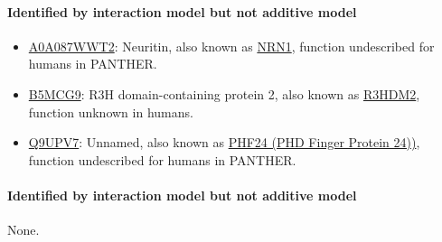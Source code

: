 \paragraph{Identified by interaction model but not additive model}

{
\small

\begin{itemize}
\item \href{http://www.pantherdb.org/genes/gene.do?acc=HUMAN\%7CHGNC\%3D17972\%7CUniProtKB\%3DQ9NPD7}{A0A087WWT2}: Neuritin, also known as \href{https://www.uniprot.org/uniprot/A0A087WWT2}{NRN1}, function undescribed for humans in PANTHER.
\item \href{http://www.pantherdb.org/genes/gene.do?acc=HUMAN\%7CHGNC\%3D29167\%7CUniProtKB\%3DQ9Y2K5}{B5MCG9}: R3H domain-containing protein 2, also known as \href{https://www.uniprot.org/uniprot/B5MCG9}{R3HDM2}, function unknown in humans.
\item \href{http://www.pantherdb.org/genes/gene.do?acc=HUMAN\%7CHGNC\%3D29180\%7CUniProtKB\%3DQ9UPV7}{Q9UPV7}: Unnamed, also known as \href{https://www.uniprot.org/uniprot/Q9UPV7}{PHF24 (PHD Finger Protein 24))}, function undescribed for humans in PANTHER.
\end{itemize}

}

\paragraph{Identified by interaction model but not additive model}

None.\\

